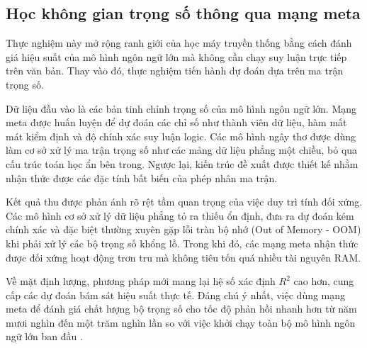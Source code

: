 \subsection{Học không gian trọng số thông qua mạng meta}
\label{subsec:hoc-khong-gian-trong-so}

Thực nghiệm này mở rộng ranh giới của học máy truyền thống bằng cách đánh giá hiệu suất của mô hình ngôn ngữ lớn mà không cần chạy suy luận trực tiếp trên văn bản. Thay vào đó, thực nghiệm tiến hành dự đoán dựa trên ma trận trọng số.

Dữ liệu đầu vào là các bản tinh chỉnh trọng số của mô hình ngôn ngữ lớn. Mạng meta được huấn luyện để dự đoán các chỉ số như thành viên dữ liệu, hàm mất mát kiểm định và độ chính xác suy luận logic. Các mô hình ngây thơ được dùng làm cơ sở xử lý ma trận trọng số như các mảng dữ liệu phẳng một chiều, bỏ qua cấu trúc toán học ẩn bên trong. Ngược lại, kiến trúc đề xuất được thiết kế nhằm nhận thức được các đặc tính bất biến của phép nhân ma trận.

Kết quả thu được phản ánh rõ rệt tầm quan trọng của việc duy trì tính đối xứng. Các mô hình cơ sở xử lý dữ liệu phẳng tỏ ra thiếu ổn định, đưa ra dự đoán kém chính xác và đặc biệt thường xuyên gặp lỗi tràn bộ nhớ (Out of Memory - OOM) khi phải xử lý các bộ trọng số khổng lồ. Trong khi đó, các mạng meta nhận thức được đối xứng hoạt động trơn tru mà không tiêu tốn quá nhiều tài nguyên RAM. 

Về mặt định lượng, phương pháp mới mang lại hệ số xác định $R^2$ cao hơn, cung cấp các dự đoán bám sát hiệu suất thực tế. Đáng chú ý nhất, việc dùng mạng meta để đánh giá chất lượng bộ trọng số cho tốc độ phản hồi nhanh hơn từ năm mươi nghìn đến một trăm nghìn lần so với việc khởi chạy toàn bộ mô hình ngôn ngữ lớn ban đầu \cite{putterman2025lora}.

